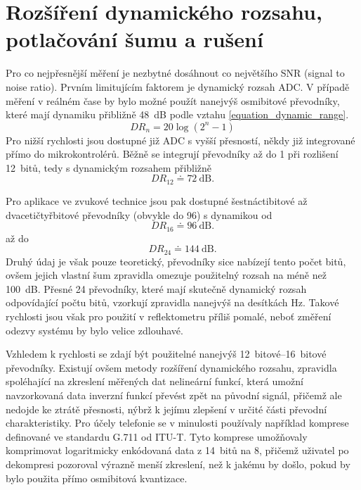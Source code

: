 \chapter{Rozšíření dynamického rozsahu, potlačování šumu a rušení}
Pro co nejpřesnější měření je nezbytné dosáhnout co největšího SNR (signal to noise ratio). Prvním limitujícím faktorem je dynamický rozsah ADC. V případě měření v reálném čase by bylo možné použít nanejvýš osmibitové převodníky, které mají dynamiku přibližně \SI{48}{\deci\bel} podle vztahu \ref{equation_dynamic_range}.
\begin{equation}
	 \mathit{DR}_n=20\log\left(2^n-1\right)
	 \label{equation_dynamic_range}
\end{equation}
Pro nižší rychlosti jsou dostupné již ADC s vyšší přesností, někdy již integrované přímo do mikrokontrolérů. Běžně se integrují převodníky až do \SI{1}{\megasample} při rozlišení 12~bitů, tedy s dynamickým rozsahem přibližně
\begin{equation}
	\mathit{DR}_{12}\doteq \SI{72}{\deci\bel}.
\end{equation}

Pro aplikace ve zvukové technice jsou pak dostupné šestnáctibitové až dvacetičtyřbitové převodníky (obvykle do \SI{96}{\kilosample}) s dynamikou od 
\begin{equation}
	\mathit{DR}_{16}\doteq \SI{96}{\deci\bel}.
\end{equation} až do
\begin{equation}
	\mathit{DR}_{24}\doteq \SI{144}{\deci\bel}.
\end{equation}
 Druhý údaj je však pouze teoretický, převodníky sice nabízejí tento počet bitů, ovšem jejich vlastní šum zpravidla omezuje použitelný rozsah na méně než \SI{100}{\deci\bel}. Přesné \SI{24}{\bit} převodníky, které mají skutečně dynamický rozsah odpovídající počtu bitů, vzorkují zpravidla nanejvýš na desítkách \si{\hertz}. Takové rychlosti jsou však pro použití v reflektometru příliš pomalé, neboť změření odezvy systému by bylo velice zdlouhavé.

Vzhledem k rychlosti se zdají být použitelné nanejvýš \SIrange{12}{16}{bitové} převodníky. Existují ovšem metody rozšíření dynamického rozsahu, zpravidla spoléhající na zkreslení měřených dat nelineární funkcí, která umožní navzorkovaná data inverzní funkcí převést zpět na původní signál, přičemž ale nedojde ke ztrátě přesnosti, nýbrž k jejímu zlepšení v určité části převodní charakteristiky. Pro účely telefonie se v minulosti používaly například komprese definované ve standardu G.711 od ITU-T. Tyto komprese umožňovaly komprimovat logaritmicky enkódovaná data z 14~bitů na 8, přičemž uživatel po dekompresi pozoroval výrazně menší zkreslení, než k jakému by došlo, pokud by bylo použita přímo osmibitová kvantizace.

